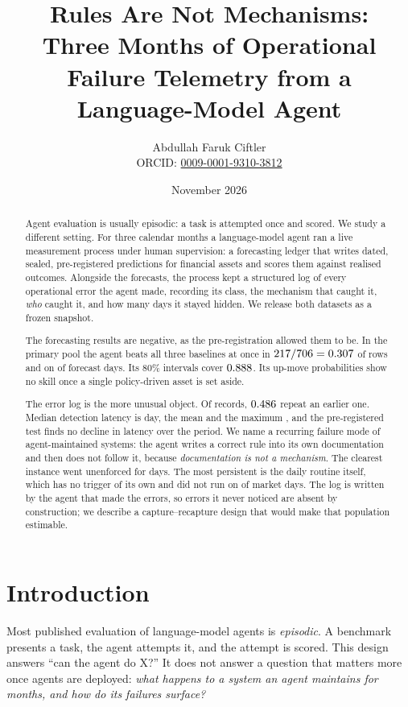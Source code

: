 \documentclass[11pt,a4paper]{article}
\title{Rules Are Not Mechanisms:\\
Three Months of Operational Failure Telemetry from a Language-Model Agent}
\author{Abdullah Faruk Ciftler\\
\small ORCID: \href{https://orcid.org/0009-0001-9310-3812}{0009-0001-9310-3812}}
\date{November 2026}
\begin{document}
\maketitle

\begin{abstract}
Agent evaluation is usually episodic: a task is attempted once and scored.
We study a different setting. For three calendar months a language-model agent
ran a live measurement process under human supervision: a forecasting ledger
that writes dated, sealed, pre-registered predictions for \NumForecastAssets{}
financial assets and scores them against realised outcomes. Alongside the
forecasts, the process kept a structured log of every operational error the
agent made, recording its class, the mechanism that caught it, \emph{who}
caught it, and how many days it stayed hidden. We release both datasets as a
frozen snapshot.

The forecasting results are negative, as the pre-registration allowed them to
be. In the primary pool the agent beats all three baselines at once in
$217/706 = 0.307$ of rows and on \DayAllWon{} of \DayAllN{}
forecast days. Its $80\%$ intervals cover $0.888$. Its up-move
probabilities show no skill once a single policy-driven asset is set aside.

The error log is the more unusual object. Of \ErrN{} records, $0.486$ repeat
an earlier one. Median detection latency is \LatMedian{} day, the mean
\LatMean{} and the maximum \LatMax{}, and the pre-registered test finds no
decline in latency over the period. We name a recurring failure mode of
agent-maintained systems: the agent writes a correct rule into its own
documentation and then does not follow it, because \emph{documentation is not
a mechanism}. The clearest instance went unenforced for \KNineThreeLat{} days.
The most persistent is the daily routine itself, which has no trigger of its
own and did not run on \OpenMissed{} of \OpenDays{} market days. The log is
written by the agent that made the errors, so errors it never noticed are
absent by construction; we describe a capture--recapture design that would
make that population estimable.
\end{abstract}

\section{Introduction}

Most published evaluation of language-model agents is \emph{episodic}. A
benchmark presents a task, the agent attempts it, and the attempt is scored.
This design answers ``can the agent do X?'' It does not answer a question that
matters more once agents are deployed: \emph{what happens to a system an agent
maintains for months, and how do its failures surface?}
\end{document}
